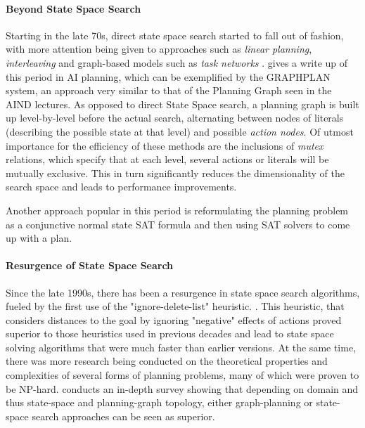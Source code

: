 \documentclass{article}
\theoremstyle{plain}
\theoremstyle{definition}
\theoremstyle{remark}
\begin{document}
\paragraph{Beyond State Space Search}

Starting in the late 70s, direct state space search started to fall out of fashion, with more attention being given to approaches such as \emph{linear planning}, \emph{interleaving} and graph-based models such as \emph{task networks} \citep[Chapter 10.3]{russell2009artificial}. \cite{weld1999recent} gives a write up of this period in AI planning, which can be exemplified by the GRAPHPLAN system, an approach very similar to that of the Planning Graph seen in the AIND lectures. As opposed to direct State Space search, a planning graph is built up level-by-level before the actual search, alternating between nodes of literals (describing the possible state at that level) and possible \emph{action nodes}. Of utmost importance for the efficiency of these methods are the inclusions of \emph{mutex} relations, which specify that at each level, several actions or literals will be mutually exclusive. This in turn significantly reduces the dimensionality of the search space and leads to performance improvements.

Another approach popular in this period is reformulating the planning problem as a conjunctive normal state SAT formula and then using SAT solvers to come up with a plan. \citep[p. 111f]{weld1999recent}

\paragraph{Resurgence of State Space Search}

Since the late 1990s, there has been a resurgence in state space search algorithms, fueled by the first use of the "ignore-delete-list" heuristic. \citep[Ch. 10.3]{russell2009artificial}. This heuristic, that considers distances to the goal by ignoring "negative" effects of actions proved superior to those heuristics used in previous decades and lead to state space solving algorithms that were much faster than earlier versions.
At the same time, there was more research being conducted on the theoretical properties and complexities of several forms of planning problems, many of which were proven to be NP-hard. \cite{hoffmann2005ignoring} conducts an in-depth survey showing that depending on domain and thus state-space and planning-graph topology, either graph-planning or state-space search approaches can be seen as superior.
\end{document}
